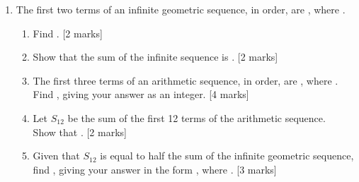 \documentclass[12pt]{article}
\begin{document}
\begin{enumerate}
\item The first two terms of an infinite geometric sequence, in order, are \underline{\hspace{1cm}}, where \underline{\hspace{1cm}}.
    \begin{enumerate}
        \item Find \underline{\hspace{1cm}}. \hfill [2 marks]
        \item Show that the sum of the infinite sequence is \underline{\hspace{1cm}}. \hfill [2 marks]
        \item The first three terms of an arithmetic sequence, in order, are \underline{\hspace{1cm}}, where \underline{\hspace{1cm}}.\\
        Find \underline{\hspace{1cm}}, giving your answer as an integer. \hfill [4 marks]
        \item Let $S_{12}$ be the sum of the first 12 terms of the arithmetic sequence.\\
        Show that \underline{\hspace{1cm}}. \hfill [2 marks]
        \item Given that $S_{12}$ is equal to half the sum of the infinite geometric sequence, find \underline{\hspace{1cm}}, giving your answer in the form \underline{\hspace{1cm}}, where \underline{\hspace{1cm}}. \hfill [3 marks]
    \end{enumerate}
\end{enumerate}
\end{document}
